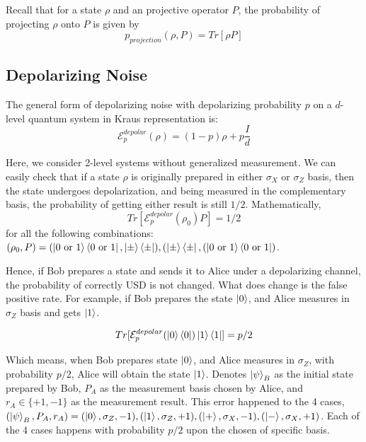 \documentclass[%
 reprint,
superscriptaddress,
 amsmath,amssymb,
 aps,
]{revtex4-2}
\begin{document}
Recall that for a state $\rho$ and an projective operator $P$, the probability of projecting $\rho$ onto $P$ is given by
\begin{equation}
    p_{projection}(\rho, P)=Tr[\rho P]
\end{equation}

\subsection{Depolarizing Noise}
The general form of depolarizing noise with depolarizing probability $p$ on a $d$-level quantum system in Kraus representation is:
\begin{equation}
    \mathcal{E}^{depolar}_{p}(\rho)=(1-p)\rho+p\frac{I}{d}
\end{equation}

Here, we consider 2-level systems without generalized measurement. We can easily check that if a state $\rho$ is originally prepared in either $\sigma_X$ or $\sigma_Z$ basis, then the state undergoes depolarization, and being measured in the complementary basis, the probability of getting either result is still $1/2$. Mathematically, 
\begin{equation}
    Tr[\mathcal{E}^{depolar}_p(\rho_0)P]=1/2
\end{equation}
for all the following combinations: $(\rho_0, P)=(\ket{0\text{ or }1}\bra{0\text{ or }1}, \ket{\pm}\bra{\pm}), (\ket{\pm}\bra{\pm}, (\ket{0\text{ or }1}\bra{0\text{ or }1})$.

Hence, if Bob prepares a state and sends it to Alice under a depolarizing channel, the probability of correctly USD is not changed. What does change is the false positive rate. For example, if Bob prepares the state $\ket{0}$, and Alice measures in $\sigma_Z$ basis and gets $\ket{1}$.

\begin{equation}
Tr[\mathcal{E}^{depolar}_p(\ket{0}\bra{0})\ket{1}\bra{1}]=p/2
\end{equation}

Which means, when Bob prepares state $\ket{0}$, and Alice measures in $\sigma_Z$, with probability $p/2$, Alice will obtain the state $\ket{1}$. Denotes $\ket{\psi}_B$ as the initial state prepared by Bob, $P_A$ as the measurement basis chosen by Alice, and $r_A\in\{+1, -1\}$ as the measurement result. This error happened to the 4 cases, $\left(\ket{\psi}_B, P_A, r_A\right)=(\ket{0},\sigma_Z, -1), (\ket{1},\sigma_Z, +1), (\ket{+},\sigma_X, -1), (\ket{-},\sigma_X, +1)$. Each of the 4 cases happens with probability $p/2$ upon the chosen of specific basis.
\end{document}
